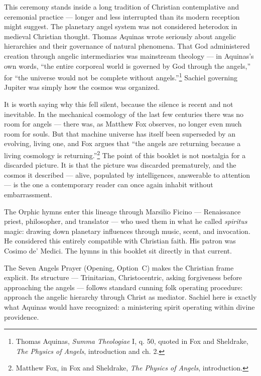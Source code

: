 \documentclass[10pt,openany]{book}
\begin{document}
{\vspace{6pt}
\noindent This ceremony stands inside a long tradition of Christian contemplative and
ceremonial practice --- longer and less interrupted than its modern reception might suggest.
The planetary angel system was not considered heterodox in medieval Christian thought.
Thomas Aquinas wrote seriously about angelic hierarchies and their governance of natural
phenomena. That God administered creation through angelic intermediaries was mainstream
theology --- in Aquinas's own words, ``the entire corporeal world is governed by God through
the angels,'' for ``the universe would not be complete without
angels.''\footnote{Thomas Aquinas, \textit{Summa Theologiae} I, q. 50, quoted in Fox and
Sheldrake, \textit{The Physics of Angels}, introduction and ch. 2.} Sachiel governing Jupiter
was simply how the cosmos was organized.

\vspace{6pt}
\noindent It is worth saying why this fell silent, because the silence is recent and not
inevitable. In the mechanical cosmology of the last few centuries there was no room for
angels --- there was, as Matthew Fox observes, no longer even much room for souls. But that
machine universe has itself been superseded by an evolving, living one, and Fox argues that
``the angels are returning because a living cosmology is
returning.''\footnote{Matthew Fox, in Fox and Sheldrake, \textit{The Physics of Angels},
introduction.} The point of this booklet is not nostalgia for a discarded picture. It is that
the picture was discarded prematurely, and the cosmos it described --- alive, populated by
intelligences, answerable to attention --- is the one a contemporary reader can once again
inhabit without embarrassment.

\vspace{6pt}
\noindent The Orphic hymns enter this lineage through Marsilio Ficino --- Renaissance
priest, philosopher, and translator --- who used them in what he called \textit{spiritus}
magic: drawing down planetary influences through music, scent, and invocation. He considered
this entirely compatible with Christian faith. His patron was Cosimo de' Medici. The hymns
in this booklet sit directly in that current.

\vspace{6pt}
\noindent The Seven Angels Prayer (Opening, Option~C) makes the Christian frame explicit.
Its structure --- Trinitarian, Christocentric, asking forgiveness before approaching the
angels --- follows standard cunning folk operating procedure: approach the angelic hierarchy
through Christ as mediator. Sachiel here is exactly what Aquinas would have recognized: a
ministering spirit operating within divine providence.

}
\end{document}
